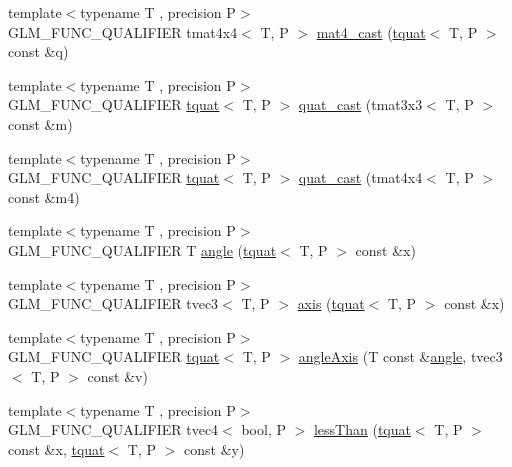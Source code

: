 \begin{DoxyCompactItemize}
\item 
{\footnotesize template$<$typename T , precision P$>$ }\\G\+L\+M\+\_\+\+F\+U\+N\+C\+\_\+\+Q\+U\+A\+L\+I\+F\+I\+E\+R tmat4x4$<$ T, P $>$ \hyperlink{group__gtc__quaternion_ga14bb2ddf028c91542763eb6f2bba47ef}{mat4\+\_\+cast} (\hyperlink{structglm_1_1tquat}{tquat}$<$ T, P $>$ const \&q)
\item 
{\footnotesize template$<$typename T , precision P$>$ }\\G\+L\+M\+\_\+\+F\+U\+N\+C\+\_\+\+Q\+U\+A\+L\+I\+F\+I\+E\+R \hyperlink{structglm_1_1tquat}{tquat}$<$ T, P $>$ \hyperlink{group__gtc__quaternion_ga950f8acff3e33bbda77895a3dcb7e5ce}{quat\+\_\+cast} (tmat3x3$<$ T, P $>$ const \&m)
\item 
{\footnotesize template$<$typename T , precision P$>$ }\\G\+L\+M\+\_\+\+F\+U\+N\+C\+\_\+\+Q\+U\+A\+L\+I\+F\+I\+E\+R \hyperlink{structglm_1_1tquat}{tquat}$<$ T, P $>$ \hyperlink{group__gtc__quaternion_ga3e4615e9884dd0f41f5617b9848a5d9c}{quat\+\_\+cast} (tmat4x4$<$ T, P $>$ const \&m4)
\item 
{\footnotesize template$<$typename T , precision P$>$ }\\G\+L\+M\+\_\+\+F\+U\+N\+C\+\_\+\+Q\+U\+A\+L\+I\+F\+I\+E\+R T \hyperlink{group__gtc__quaternion_gad4a4448baedb198b2b1e7880d2544dc9}{angle} (\hyperlink{structglm_1_1tquat}{tquat}$<$ T, P $>$ const \&x)
\item 
{\footnotesize template$<$typename T , precision P$>$ }\\G\+L\+M\+\_\+\+F\+U\+N\+C\+\_\+\+Q\+U\+A\+L\+I\+F\+I\+E\+R tvec3$<$ T, P $>$ \hyperlink{group__gtc__quaternion_ga0b3e87a13b2708154b72259e50789a19}{axis} (\hyperlink{structglm_1_1tquat}{tquat}$<$ T, P $>$ const \&x)
\item 
{\footnotesize template$<$typename T , precision P$>$ }\\G\+L\+M\+\_\+\+F\+U\+N\+C\+\_\+\+Q\+U\+A\+L\+I\+F\+I\+E\+R \hyperlink{structglm_1_1tquat}{tquat}$<$ T, P $>$ \hyperlink{group__gtc__quaternion_ga37ae19405f1ccf766f27e4fcd035d859}{angle\+Axis} (T const \&\hyperlink{group__gtc__quaternion_gad4a4448baedb198b2b1e7880d2544dc9}{angle}, tvec3$<$ T, P $>$ const \&v)
\item 
{\footnotesize template$<$typename T , precision P$>$ }\\G\+L\+M\+\_\+\+F\+U\+N\+C\+\_\+\+Q\+U\+A\+L\+I\+F\+I\+E\+R tvec4$<$ bool, P $>$ \hyperlink{group__gtc__quaternion_ga91a40d16a3b5bb47d71ac1a3fb688ffa}{less\+Than} (\hyperlink{structglm_1_1tquat}{tquat}$<$ T, P $>$ const \&x, \hyperlink{structglm_1_1tquat}{tquat}$<$ T, P $>$ const \&y)

\end{DoxyCompactItemize}
